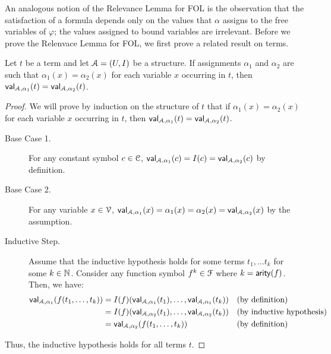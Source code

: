 \documentclass[11pt,usenames, dvipsnames]{article}
\begin{document}
An analogous notion of the Relevance Lemma for FOL is the observation that the satisfaction of a formula depends only on the values that $\alpha$ assigns to the free variables of $\varphi$; the values assigned to bound variables are irrelevant. Before we prove the Relenvace Lemma for FOL, we first prove a related result on terms.

\begin{lemma}
  Let $t$ be a term and let $\struct = (U, I)$ be a structure. If assignments $\alpha_1$ and $\alpha_2$ are such that $\alpha_1(x) = \alpha_2(x)$ for each variable $x$ occurring in $t$, then $\val{\struct, \alpha_1}{t} = \val{\struct, \alpha_2}{t}$.
\end{lemma}

\begin{proof}[Proof]
  We will prove by induction on the structure of $t$ that if $\alpha_1(x) = \alpha_2(x)$ for each variable $x$ occurring in $t$, then $\val{\struct, \alpha_1}{t} = \val{\struct, \alpha_2}{t}$.

  \begin{description}
    \item[Base Case 1.] For any constant symbol $c \in \conn$, $\val{\struct, \alpha_1}{c} = I(c) = \val{\struct, \alpha_2}{c}$ by definition.

    \item[Base Case 2.] For any variable $x \in \vars$, $\val{\struct, \alpha_1}{x} = \alpha_1(x) = \alpha_2(x) = \val{\struct, \alpha_2}{x}$ by the assumption. 

    \item[Inductive Step.] Assume that the inductive hypothesis holds for some terms $t_1, \ldots t_k$ for some $k \in \mathbb{N}$. Consider any function symbol $f^k \in \func$ where $k = \mathsf{arity}(f)$. Then, we have:
    \begin{align*}
    \val{\struct, \alpha_1}{f(t_1, \ldots, t_k)} &= I(f)(\val{\struct, \alpha_1}{t_1}, \ldots, \val{\struct, \alpha_1}{t_k}) &&\text{(by definition)}
    \\
    &= I(f)(\val{\struct, \alpha_2}{t_1}, \ldots, \val{\struct, \alpha_2}{t_k}) &&\text{(by inductive hypothesis)}
    \\
    &= \val{\struct, \alpha_2}{f(t_1, \ldots, t_k)} &&\text{(by definition)}
    \end{align*}
  \end{description}
  Thus, the inductive hypothesis holds for all terms $t$.
\end{proof}
\end{document}
